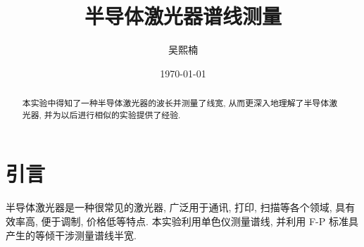 \documentclass[aps,pre,12pt,preprint,%
	onecolumn,showpacs,showkeys,nofootinbib]{revtex4-2}
\begin{document}
	\title{%
	\texstringonly{\hfil\\[2\baselineskip]}
	\sf\LARGE%
		半导体激光器谱线测量%
	\texstringonly{\vspace{3ex}}}
	\author{\fangsong\large%
		吴熙楠%
	\vspace{2mm}}
	\date{\today}
	
\begin{abstract}
\vspace{10mm}
\begin{spacing}{1.5}\normalsize
\setlength{\parskip}{.3\baselineskip}
%	
本实验中得知了一种半导体激光器的波长并测量了线宽, 从而更深入地理解了半导体激光器, 并为以后进行相似的实验提供了经验.
\end{spacing}
\end{abstract}
\clearpage
\maketitle
\thispagestyle{titlepagestyle}
%

\newpage
\section{引言}
半导体激光器是一种很常见的激光器, 广泛用于通讯, 打印, 扫描等各个领域, 具有效率高, 便于调制, 价格低等特点. 本实验利用单色仪测量谱线, 并利用 F-P 标准具产生的等倾干涉测量谱线半宽.
\end{document}
